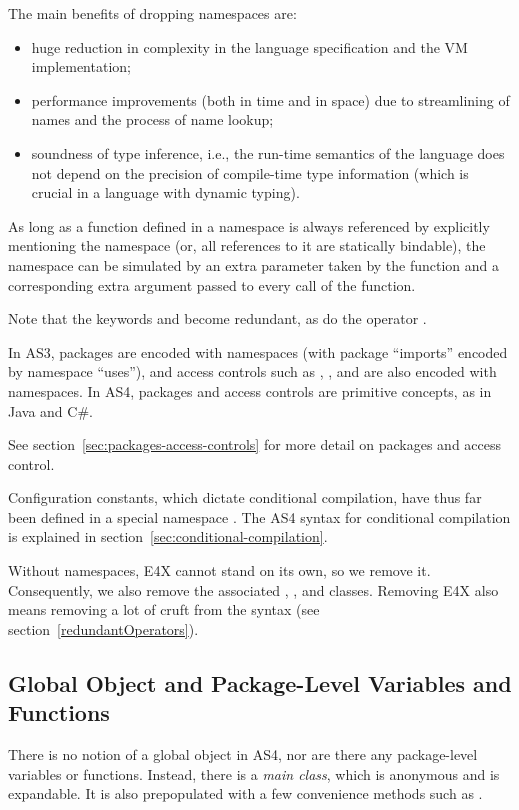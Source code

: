 The main benefits of dropping namespaces are:

\begin{itemize}
\item huge reduction in complexity in the language specification and
  the VM implementation;
\item performance improvements (both in time and in space) due to
  streamlining of
  names and the process of name lookup;
\item soundness of type inference, i.e., the run-time
  semantics of the language does not depend on the precision of
  compile-time type information (which is crucial in a language with
  dynamic typing).
\end{itemize}

As long as a function defined in a namespace is always referenced by
explicitly mentioning the namespace (or, all references to it are statically
bindable), the namespace can be simulated by
an extra parameter taken by the function and a corresponding extra
argument passed to every call of the function.

Note that the keywords  and  become redundant, as do
the operator \code{::}.

In AS3, packages are encoded with namespaces (with package
``imports'' encoded by namespace ``uses''), and access controls such as
, , and  are also encoded with
namespaces. In AS4, packages and access controls are primitive
concepts, as in Java and C\#.

See section~\ref{sec:packages-access-controls} for more detail on packages and access control.

Configuration constants, which dictate conditional compilation, have
thus far been defined in a special namespace . The AS4 syntax
for conditional compilation is explained in section~\ref{sec:conditional-compilation}.


Without namespaces, E4X cannot stand on its own, so we remove
it. Consequently, we also remove the associated , , and
 classes. Removing E4X also means
removing a lot of cruft from the syntax (see section~\ref{redundantOperators}).

\subsection{Global Object and Package-Level Variables and Functions}
\label{GlobalObject}
There is no notion of a global object in AS4, nor are there any package-level
variables or functions. Instead, there is a {\em main class}, which is anonymous
and is expandable. It is also prepopulated with a few convenience methods such as .

